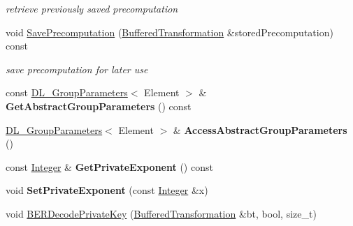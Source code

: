 \begin{DoxyCompactItemize}
\begin{DoxyCompactList}\small\item\em retrieve previously saved precomputation \item\end{DoxyCompactList}\item 
\hypertarget{class_d_l___private_key_impl_ad2599d9c720966f22e0cae5dfdaaed41}{
void \hyperlink{class_d_l___private_key_impl_ad2599d9c720966f22e0cae5dfdaaed41}{SavePrecomputation} (\hyperlink{class_buffered_transformation}{BufferedTransformation} \&storedPrecomputation) const }
\label{class_d_l___private_key_impl_ad2599d9c720966f22e0cae5dfdaaed41}

\begin{DoxyCompactList}\small\item\em save precomputation for later use \item\end{DoxyCompactList}\item 
\hypertarget{class_d_l___private_key_impl_a4c8227e732ca255f5633ca1d4682dd9a}{
const \hyperlink{class_d_l___group_parameters}{DL\_\-GroupParameters}$<$ Element $>$ \& {\bfseries GetAbstractGroupParameters} () const }
\label{class_d_l___private_key_impl_a4c8227e732ca255f5633ca1d4682dd9a}

\item 
\hypertarget{class_d_l___private_key_impl_a9410559fee36df445fe3743634f87950}{
\hyperlink{class_d_l___group_parameters}{DL\_\-GroupParameters}$<$ Element $>$ \& {\bfseries AccessAbstractGroupParameters} ()}
\label{class_d_l___private_key_impl_a9410559fee36df445fe3743634f87950}

\item 
\hypertarget{class_d_l___private_key_impl_a996b891350fc796ce56a32d984a91aee}{
const \hyperlink{class_integer}{Integer} \& {\bfseries GetPrivateExponent} () const }
\label{class_d_l___private_key_impl_a996b891350fc796ce56a32d984a91aee}

\item 
\hypertarget{class_d_l___private_key_impl_ad2756b046f9ee7f3c254c9fc2bb8be5d}{
void {\bfseries SetPrivateExponent} (const \hyperlink{class_integer}{Integer} \&x)}
\label{class_d_l___private_key_impl_ad2756b046f9ee7f3c254c9fc2bb8be5d}

\item 
\hypertarget{class_d_l___private_key_impl_a0d0c5c926211c5b35002dd3b8d22664c}{
void \hyperlink{class_d_l___private_key_impl_a0d0c5c926211c5b35002dd3b8d22664c}{BERDecodePrivateKey} (\hyperlink{class_buffered_transformation}{BufferedTransformation} \&bt, bool, size\_\-t)}
\label{class_d_l___private_key_impl_a0d0c5c926211c5b35002dd3b8d22664c}


\end{DoxyCompactItemize}
